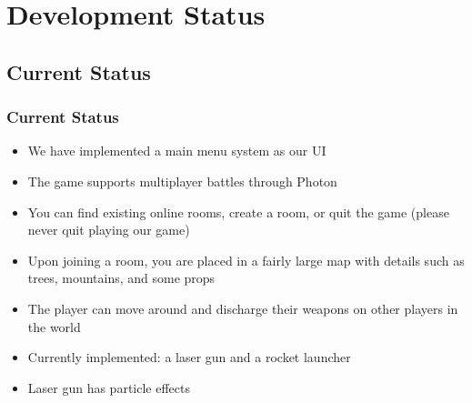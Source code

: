\documentclass{beamer}
\begin{document}
\section{Development Status}

\subsection{Current Status}
\begin{frame}
\frametitle{Current Status}
    \begin{itemize}
        \item We have implemented a main menu system as our UI
        \item The game supports multiplayer battles through Photon
        \item You can find existing online rooms, create a room, or quit the game (please never quit playing our game)
        \item Upon joining a room, you are placed in a fairly large map with details such as trees, mountains, and some props
        \item The player can move around and discharge their weapons on other players in the world
        \item Currently implemented: a laser gun and a rocket launcher
        \item Laser gun has particle effects
    \end{itemize}
\end{frame}
\end{document}
